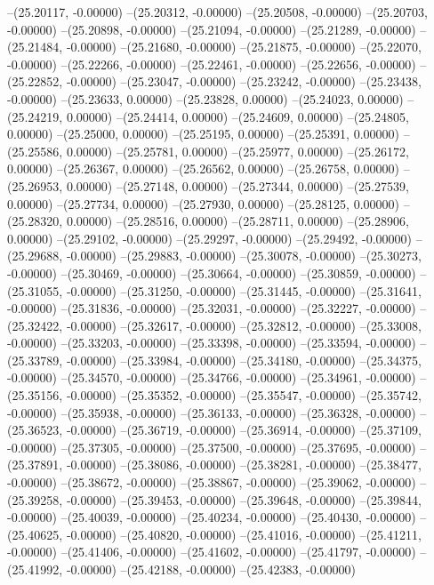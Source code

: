 --(25.20117, -0.00000)
--(25.20312, -0.00000)
--(25.20508, -0.00000)
--(25.20703, -0.00000)
--(25.20898, -0.00000)
--(25.21094, -0.00000)
--(25.21289, -0.00000)
--(25.21484, -0.00000)
--(25.21680, -0.00000)
--(25.21875, -0.00000)
--(25.22070, -0.00000)
--(25.22266, -0.00000)
--(25.22461, -0.00000)
--(25.22656, -0.00000)
--(25.22852, -0.00000)
--(25.23047, -0.00000)
--(25.23242, -0.00000)
--(25.23438, -0.00000)
--(25.23633, 0.00000)
--(25.23828, 0.00000)
--(25.24023, 0.00000)
--(25.24219, 0.00000)
--(25.24414, 0.00000)
--(25.24609, 0.00000)
--(25.24805, 0.00000)
--(25.25000, 0.00000)
--(25.25195, 0.00000)
--(25.25391, 0.00000)
--(25.25586, 0.00000)
--(25.25781, 0.00000)
--(25.25977, 0.00000)
--(25.26172, 0.00000)
--(25.26367, 0.00000)
--(25.26562, 0.00000)
--(25.26758, 0.00000)
--(25.26953, 0.00000)
--(25.27148, 0.00000)
--(25.27344, 0.00000)
--(25.27539, 0.00000)
--(25.27734, 0.00000)
--(25.27930, 0.00000)
--(25.28125, 0.00000)
--(25.28320, 0.00000)
--(25.28516, 0.00000)
--(25.28711, 0.00000)
--(25.28906, 0.00000)
--(25.29102, -0.00000)
--(25.29297, -0.00000)
--(25.29492, -0.00000)
--(25.29688, -0.00000)
--(25.29883, -0.00000)
--(25.30078, -0.00000)
--(25.30273, -0.00000)
--(25.30469, -0.00000)
--(25.30664, -0.00000)
--(25.30859, -0.00000)
--(25.31055, -0.00000)
--(25.31250, -0.00000)
--(25.31445, -0.00000)
--(25.31641, -0.00000)
--(25.31836, -0.00000)
--(25.32031, -0.00000)
--(25.32227, -0.00000)
--(25.32422, -0.00000)
--(25.32617, -0.00000)
--(25.32812, -0.00000)
--(25.33008, -0.00000)
--(25.33203, -0.00000)
--(25.33398, -0.00000)
--(25.33594, -0.00000)
--(25.33789, -0.00000)
--(25.33984, -0.00000)
--(25.34180, -0.00000)
--(25.34375, -0.00000)
--(25.34570, -0.00000)
--(25.34766, -0.00000)
--(25.34961, -0.00000)
--(25.35156, -0.00000)
--(25.35352, -0.00000)
--(25.35547, -0.00000)
--(25.35742, -0.00000)
--(25.35938, -0.00000)
--(25.36133, -0.00000)
--(25.36328, -0.00000)
--(25.36523, -0.00000)
--(25.36719, -0.00000)
--(25.36914, -0.00000)
--(25.37109, -0.00000)
--(25.37305, -0.00000)
--(25.37500, -0.00000)
--(25.37695, -0.00000)
--(25.37891, -0.00000)
--(25.38086, -0.00000)
--(25.38281, -0.00000)
--(25.38477, -0.00000)
--(25.38672, -0.00000)
--(25.38867, -0.00000)
--(25.39062, -0.00000)
--(25.39258, -0.00000)
--(25.39453, -0.00000)
--(25.39648, -0.00000)
--(25.39844, -0.00000)
--(25.40039, -0.00000)
--(25.40234, -0.00000)
--(25.40430, -0.00000)
--(25.40625, -0.00000)
--(25.40820, -0.00000)
--(25.41016, -0.00000)
--(25.41211, -0.00000)
--(25.41406, -0.00000)
--(25.41602, -0.00000)
--(25.41797, -0.00000)
--(25.41992, -0.00000)
--(25.42188, -0.00000)
--(25.42383, -0.00000)
